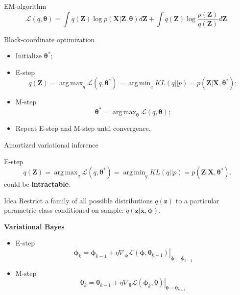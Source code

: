 \documentclass{beamer}
\newcommand{\bx}{\mathbf{x}}
\newcommand{\bz}{\mathbf{z}}
\newcommand{\bX}{\mathbf{X}}
\newcommand{\bZ}{\mathbf{Z}}
\newcommand{\btheta}{\boldsymbol{\theta}}
\newcommand{\bphi}{\boldsymbol{\phi}}
\DeclareMathOperator*{\argmin}{arg\,min}
\DeclareMathOperator*{\argmax}{arg\,max}
\begin{document}
\begin{frame}{EM-algorithm}
	\[
		\mathcal{L} (q, \btheta)  = \int q(\bZ) \log p(\bX | \bZ, \btheta) d\bZ + \int q(\bZ) \log \frac{p(\bZ)}{q(\bZ)}d\bZ.
	\]
	\begin{block}{Block-coordinate optimization}
	\begin{itemize}
		\item Initialize $\btheta^*$;
		\item E-step
		\[
			q(\bZ) = \argmax_q \mathcal{L} (q, \btheta^*) = \argmin_q KL(q || p) =
			 p(\bZ| \bX, \btheta^*);
		\]
		\item M-step
		\[
			\btheta^* = \argmax_{\btheta} \mathcal{L} (q, \btheta);
		\]
		\item Repeat E-step and M-step until convergence.
	\end{itemize}
	\end{block}
\end{frame}
\begin{frame}{Amortized variational inference}
    \begin{block}{E-step}
    \vspace{-0.3cm}
    \[
		q(\bZ) = \argmax_q \mathcal{L} (q, \btheta^*) = \argmin_q KL(q || p) =
		 p(\bZ| \bX, \btheta^*).
	\]
	could be \textbf{intractable}.
    \end{block}
	\begin{block}{Idea}
	Restrict a family of all possible distributions $q(\bz)$ to a particular parametric class conditioned on sample: $q(\bz|\bx, \bphi)$.
	\end{block}
	
	\textbf{Variational Bayes}
	\begin{itemize}
		\item E-step
		\[
		\bphi_k = \bphi_{k-1} + \left.\eta \nabla_{\bphi} \mathcal{L}(\bphi, \btheta_{k-1})\right|_{\bphi=\bphi_{k-1}}
		\]
		\item M-step
		\[
		\btheta_k = \btheta_{k-1} + \left.\eta \nabla_{\btheta} \mathcal{L}(\bphi_k, \btheta)\right|_{\btheta=\btheta_{k-1}}
		\]
	\end{itemize}
\end{frame}
\end{document}
